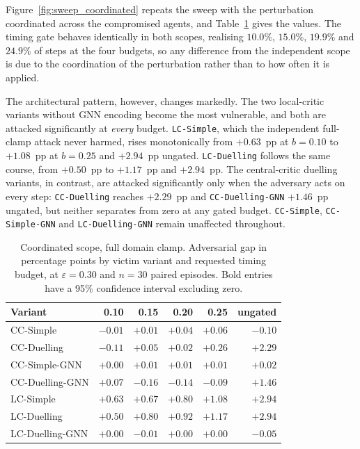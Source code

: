 Figure~\ref{fig:sweep_coordinated} repeats the sweep with the perturbation coordinated
across the compromised agents, and Table~\ref{tab:gap_sweep_coordinated} gives the
values. The timing gate behaves identically in both scopes, realising $10.0\%$,
$15.0\%$, $19.9\%$ and $24.9\%$ of steps at the four budgets, so any difference from the
independent scope is due to the coordination of the perturbation rather than to how
often it is applied.

The architectural pattern, however, changes markedly. The two local-critic variants
without GNN encoding become the most vulnerable, and both are attacked significantly
at \emph{every} budget. \texttt{LC-Simple}, which the independent full-clamp attack
never harmed,
rises monotonically from $+0.63$~pp at $b = 0.10$ to $+1.08$~pp at $b = 0.25$ and
$+2.94$~pp ungated. \texttt{LC-Duelling} follows the same course, from $+0.50$~pp to
$+1.17$~pp and $+2.94$~pp. The central-critic duelling variants, in contrast, are
attacked significantly only when the adversary acts on every step:
\texttt{CC-Duelling} reaches $+2.29$~pp and \texttt{CC-Duelling-GNN} $+1.46$~pp
ungated, but neither separates from zero at any gated budget. \texttt{CC-Simple},
\texttt{CC-Simple-GNN} and \texttt{LC-Duelling-GNN} remain unaffected throughout.

\begin{table}[htbp]
  \centering
  \caption{Coordinated scope, full domain clamp. Adversarial gap in percentage points
           by victim variant and requested timing budget, at $\varepsilon = 0.30$ and
           $n = 30$ paired episodes. Bold entries have a 95\% confidence interval
           excluding zero.}
  \label{tab:gap_sweep_coordinated}
  \begin{tabular}{lrrrrr}
    \hline
    \textbf{Variant} & \textbf{0.10} & \textbf{0.15} & \textbf{0.20} & \textbf{0.25} & \textbf{ungated} \\
    \hline
    CC-Simple        & $-0.01$ & $+0.01$ & $+0.04$ & $+0.06$ & $-0.10$ \\
    CC-Duelling      & $-0.11$ & $+0.05$ & $+0.02$ & $+0.26$ & $\mathbf{+2.29}$ \\
    CC-Simple-GNN    & $+0.00$ & $+0.01$ & $+0.01$ & $+0.01$ & $+0.02$ \\
    CC-Duelling-GNN  & $+0.07$ & $-0.16$ & $-0.14$ & $-0.09$ & $\mathbf{+1.46}$ \\
    LC-Simple        & $\mathbf{+0.63}$ & $\mathbf{+0.67}$ & $\mathbf{+0.80}$ & $\mathbf{+1.08}$ & $\mathbf{+2.94}$ \\
    LC-Duelling      & $\mathbf{+0.50}$ & $\mathbf{+0.80}$ & $\mathbf{+0.92}$ & $\mathbf{+1.17}$ & $\mathbf{+2.94}$ \\
    LC-Duelling-GNN  & $+0.00$ & $-0.01$ & $+0.00$ & $+0.00$ & $-0.05$ \\
    \hline
  \end{tabular}
\end{table}

